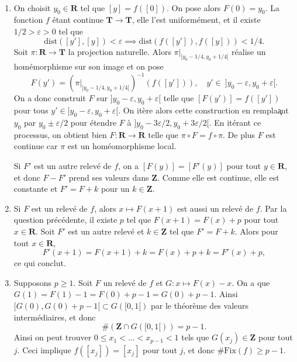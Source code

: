 \documentclass[a4paper,12pt,openany]{article}
\theoremstyle{plain}
\theoremstyle{definition}
\newcommand{\T}{\mathbf{T}}
\newcommand{\R}{\mathbf{R}}
\newcommand{\Z}{\mathbf{Z}}
\begin{document}
\hfill \break 


 \\ 

\begin{enumerate}
\item On choisit $y_0 \in \R$ tel que $[y] = f([0])$. On pose alors $F(0) = y_0$. La fonction $f$ \'etant continue $\T \to \T$, elle l'est uniform\'ement, et il existe $1/2 > \varepsilon > 0$ tel que 
\begin{equation}\label{eq:unif}
\mathrm{dist}([y'], [y]) < \varepsilon \implies \mathrm{dist}(f([y']), f([y])) < 1/4.
\end{equation}
Soit $\pi : \R \to \T$ la projection naturelle. Alors $\pi|_{]y_0-1/4, y_0+1/4[}$ r\'ealise un hom\'emorphisme sur son image et on pose
$$
F(y') = (\pi|_{]y_0-1/4, y_0+1/4[})^{-1}(f([y'])), \quad y' \in ~ ]y_0-\varepsilon, y_0 + \varepsilon[.
$$
On a donc construit $F$ sur $]y_0- \varepsilon, y_0 + \varepsilon[$ telle que $[F(y')] = f([y'])$ pour tous $y' \in ]y_0- \varepsilon, y_0 + \varepsilon[$. On it\`ere alors cette construction en rempla\c ant $y_0$ par $y_0 \pm \varepsilon / 2$ pour \'etendre $F$ \`a $]y_0 - 3 \varepsilon / 2, y_0 + 3 \varepsilon /2[.$ En it\'erant ce processus, on obtient bien $F : \R \to \R$ telle que $\pi \circ F = f \circ \pi$. De plus $F$ est continue car $\pi$ est un hom\'eomorphisme local.

Si $F'$ est un autre relev\'e de $f$, on a $[F(y)] = [F'(y)]$ pour tout $y \in \R$, et donc $F-F'$ prend ses valeurs dans $\Z$. Comme elle est continue, elle est constante et $F' = F + k$ pour un $k \in \Z$.

\item Si $F$ est un relev\'e de $f$, alors $x \mapsto F(x+1)$ est aussi un relev\'e de $f$. Par la question pr\'ec\'edente, il existe $p$ tel que $F(x+1) = F(x) + p$ pour tout $x \in \R$. Soit $F'$ est un autre relev\'e et $k \in \Z$ tel que $F' = F + k$. Alors pour tout $x \in \R,$
$$F'(x+1) = F(x+1) + k = F(x) + p + k = F'(x) + p,$$
ce qui conclut.

\item \label{q:3} Supposons $p \geq 1$. Soit $F$ un relev\'e de $f$ et $G : x \mapsto F(x) - x$. On a que $G(1) = F(1) - 1 = F(0) + p - 1 = G(0) + p -1$. Ainsi $[G(0), G(0) + p-1[ \subset G([0,1[)$ par le th\'eor\`eme des valeurs interm\'ediaires, et donc 
$$
\#(\Z \cap G([0, 1[)) = p - 1.
$$
Ainsi on peut trouver $0 \leq x_1<\dots <x_{p-1}<1$ tels que $G(x_j) \in \Z$ pour tout $j$. Ceci implique $f([x_j]) = [x_j]$ pour tout $j$, et donc $\# \mathrm{Fix}(f) \geq p - 1.$


\end{enumerate}
\end{document}

